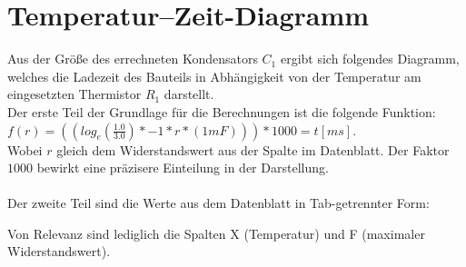 \documentclass[12pt,titlepage]{article}
\begin{document}
	\section{Temperatur--Zeit-Diagramm}
		Aus der Größe des errechneten Kondensators $C_1$ ergibt sich folgendes Diagramm, welches die Ladezeit des Bauteils in Abhängigkeit von der Temperatur am eingesetzten Thermistor $R_1$ darstellt.\\
		Der erste Teil der Grundlage für die Berechnungen ist die folgende Funktion: \\
		$f(r) = ((log_e(\frac{1.0}{3.0})*-1*r*(1mF)))*1000 = t [ms]$.\\
		Wobei $r$ gleich dem Widerstandswert aus der Spalte im Datenblatt. Der Faktor $1000$ bewirkt eine präzisere Einteilung in der Darstellung.\\
		\hfill\\
		Der zweite Teil sind die Werte aus dem Datenblatt in Tab-getrennter Form:
		
		Von Relevanz sind lediglich die Spalten X (Temperatur) und F (maximaler Widerstandswert).
		
\end{document}
